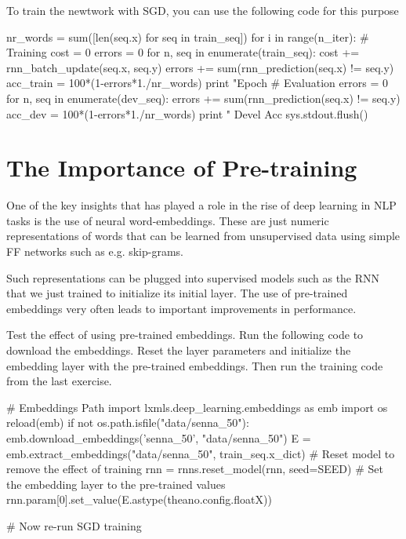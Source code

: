 \begin{exercise}
\clearpage

\noindent To train the newtwork with SGD, you can use the following code for
this purpose
\begin{python}
nr_words = sum([len(seq.x) for seq in train_seq])
for i in range(n_iter):
    # Training
    cost = 0
    errors = 0
    for n, seq in enumerate(train_seq):
        cost += rnn_batch_update(seq.x, seq.y)
        errors += sum(rnn_prediction(seq.x) != seq.y)
    acc_train = 100*(1-errors*1./nr_words) 
    print "Epoch %
    # Evaluation    
    errors = 0
    for n, seq in enumerate(dev_seq):
        errors += sum(rnn_prediction(seq.x) != seq.y)  
    acc_dev = 100*(1-errors*1./nr_words) 
    print " Devel Acc %
    sys.stdout.flush()
\end{python}


\end{exercise}


\section{The Importance of Pre-training}


One of the key insights that has played a role in the rise of deep learning in
NLP tasks is the use of neural word-embeddings. These are just numeric 
representations of words that can be learned from unsupervised data using
simple FF networks such as e.g. skip-grams.

Such representations can be plugged into supervised models such as the RNN that we just
trained to initialize its initial layer. The use of pre-trained embeddings very often leads to
important improvements in performance. 

\begin{exercise}
Test the effect of using pre-trained embeddings. Run the following code to
download the embeddings. Reset the layer parameters and initialize the
embedding layer with the pre-trained embeddings. Then run the training code
from the last exercise.
\begin{python}
# Embeddings Path
import lxmls.deep_learning.embeddings as emb
import os
reload(emb)
if not os.path.isfile("data/senna_50"):
    emb.download_embeddings('senna_50', "data/senna_50")
E = emb.extract_embeddings("data/senna_50", train_seq.x_dict) 
# Reset model to remove the effect of training
rnn = rnns.reset_model(rnn, seed=SEED)
# Set the embedding layer to the pre-trained values
rnn.param[0].set_value(E.astype(theano.config.floatX)) 

# Now re-run SGD training
\end{python}
\end{exercise}

